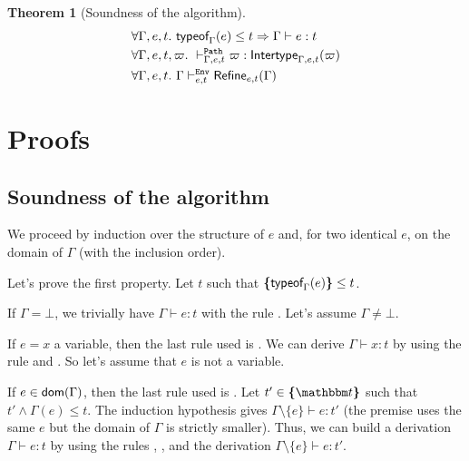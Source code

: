 \documentclass[a4paper]{article}
\theoremstyle{definition}
\newtheorem{theorem}{Theorem}
\newtheorem{lemma}{Lemma}
\begin{document}
%

  \begin{theorem}[Soundness of the algorithm]
    \begin{align*}
      &\forall \Gamma, e, t.\ \textsf{typeof}_{\Gamma}(e) \leq t \Rightarrow \Gamma \vdash e:t\\
      &\forall \Gamma, e, t, \varpi.\ \vdash^{\texttt{Path}}_{\Gamma,e,t} \varpi:\textsf{Intertype}_{\Gamma,e,t} (\varpi)\\
      &\forall \Gamma, e, t.\ \Gamma \vdash^{\texttt{Env}}_{e,t} \textsf{Refine}_{e,t}(\Gamma)
    \end{align*}
  \end{theorem}

  \section{Proofs}

  \subsection{Soundness of the algorithm}

  We proceed by induction over the structure of $e$
  and, for two identical $e$, on the domain of $\Gamma$ (with the inclusion order).

  Let's prove the first property.
  Let $t$ such that $\textbf{\textup{\{}}\textsf{typeof}_{\Gamma}(e)\textbf{\textup{\}}} \leq t$.

  If $\Gamma = \bot$, we trivially have $\Gamma \vdash e:t$ with the rule .
  Let's assume $\Gamma \neq \bot$.

  If $e=x$ a variable, then the last rule used is .
  We can derive $\Gamma \vdash x:t$ by using the rule  and .
  So let's assume that $e$ is not a variable.

  If $e\in\textsf{dom}(\Gamma)$, then the last rule used is .
  Let $t'\in\tsint{\ts}$ such that $t'\land\Gamma(e)\leq t$.
  The induction hypothesis gives $\Gamma\setminus\{e\} \vdash e:t'$
  (the premise uses the same $e$ but the domain of $\Gamma$ is strictly smaller).
  Thus, we can build a derivation $\Gamma \vdash e:t$ by using the rules , ,
   and the derivation $\Gamma\setminus\{e\} \vdash e:t'$.
\end{document}

